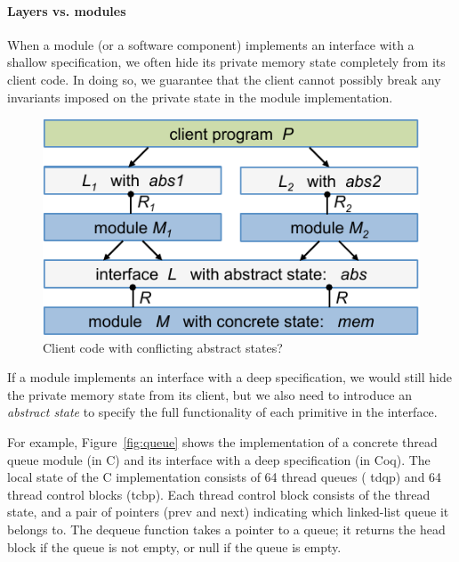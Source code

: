 \paragraph{Layers vs. modules} 
When a module (or a software component)
implements an interface with a shallow specification, 
we often hide its private memory state completely
from its client code. In doing so, we guarantee that the client
cannot possibly break any invariants imposed on the private state
in the module implementation.

\begin{figure}[t]\centering
\includegraphics[scale=1]{figs/conflict}
\caption{Client code with conflicting abstract states?}
\label{fig:conflict}
\end{figure}

If a module implements an interface with a deep specification, we
would still hide the private memory state from its client, but we also
need to introduce an {\em abstract state} to specify
the full functionality of each primitive in the interface. 

For example, Figure~\ref{fig:queue} shows the implementation of a
concrete thread queue module (in C) and its interface with a deep
specification (in Coq). The local state of the C implementation
consists of 64 thread queues (%
\textsf{tdqp}) and 64 thread control blocks
(\textsf{tcbp}).  Each thread control block consists of the thread state,
and a pair of pointers (\textsf{prev} and \textsf{next}) indicating which
linked-list queue it belongs to. The \textsf{dequeue} function 
takes a pointer to a queue; it returns the head block if the queue
is not empty, or null if the queue is empty.

